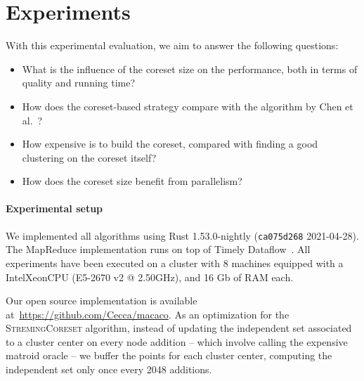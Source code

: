 \section{Experiments}

\newcommand{\mc}[1]{{\color{red} --- MC: #1 ---}}

\graphicspath{{../imgs/}}

\newcommand{\data}[1]{\texttt{#1}}
\newcommand{\higgs}{\texttt{Higgs}\xspace}
\newcommand{\phones}{\texttt{Phones}\xspace}
\newcommand{\wiki}{\texttt{Wiki}\xspace}
\newcommand{\chen}{\textsc{ChenEtAl}\xspace}
\newcommand{\seq}{\textsc{SeqCoreset}\xspace}
\newcommand{\stream}{\textsc{StremingCoreset}\xspace}
\newcommand{\mapr}{\textsc{MRCoreset}\xspace}

With this experimental evaluation, we aim to answer the following questions:
\begin{itemize}
    \item What is the influence of the coreset size on the performance, 
        both in terms of quality and running time?
    \item How does the coreset-based strategy compare with the algorithm 
        by Chen et al.~\cite{DBLP:journals/algorithmica/ChenLLW16}?
    \item How expensive is to build the coreset, compared with finding
        a good clustering on the coreset itself?
    \item How does the coreset size benefit from parallelism?
\end{itemize}

\paragraph*{Experimental setup}
We implemented all algorithms using Rust 1.53.0-nightly (\texttt{ca075d268} 2021-04-28).
The MapReduce implementation runs on top of Timely Dataflow~\cite{DBLP:journals/cacm/MurrayMIIBA16}.
All experiments have been executed on a cluster with 8 machines equipped
with a Intel\textregistered Xeon\textregistered CPU (E5-2670 v2 @ 2.50GHz), and 16 Gb of RAM each.

Our open source implementation is available at~\url{https://github.com/Cecca/macaco}.
As an optimization for the \stream algorithm, instead of updating the independent set associated to a cluster center on every node addition
-- which involve calling the expensive matroid oracle -- we buffer the points for each cluster center,
computing the independent set only once every 2048 additions.

